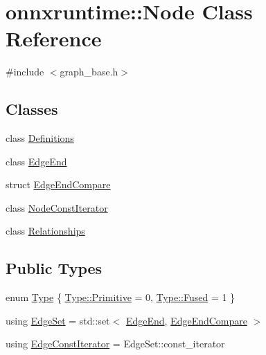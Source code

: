 \hypertarget{classonnxruntime_1_1Node}{}\section{onnxruntime\+:\+:Node Class Reference}
\label{classonnxruntime_1_1Node}


{\ttfamily \#include $<$graph\+\_\+base.\+h$>$}

\subsection*{Classes}
\begin{DoxyCompactItemize}
\item 
class \mbox{\hyperlink{classonnxruntime_1_1Node_1_1Definitions}{Definitions}}
\item 
class \mbox{\hyperlink{classonnxruntime_1_1Node_1_1EdgeEnd}{Edge\+End}}
\item 
struct \mbox{\hyperlink{structonnxruntime_1_1Node_1_1EdgeEndCompare}{Edge\+End\+Compare}}
\item 
class \mbox{\hyperlink{classonnxruntime_1_1Node_1_1NodeConstIterator}{Node\+Const\+Iterator}}
\item 
class \mbox{\hyperlink{classonnxruntime_1_1Node_1_1Relationships}{Relationships}}
\end{DoxyCompactItemize}
\subsection*{Public Types}
\begin{DoxyCompactItemize}
\item 
enum \mbox{\hyperlink{classonnxruntime_1_1Node_a2d9625711aecc66f9b9373d61f794f6a}{Type}} \{ \mbox{\hyperlink{classonnxruntime_1_1Node_a2d9625711aecc66f9b9373d61f794f6aa07ee3427562e4f1a5c9f2bfb17fd9eee}{Type\+::\+Primitive}} = 0, 
\mbox{\hyperlink{classonnxruntime_1_1Node_a2d9625711aecc66f9b9373d61f794f6aaf617f46b788e11a564cb16c9f5d59fea}{Type\+::\+Fused}} = 1
 \}
\item 
using \mbox{\hyperlink{classonnxruntime_1_1Node_a96c203b69f604fcbe80532f9d939dcc6}{Edge\+Set}} = std\+::set$<$ \mbox{\hyperlink{classonnxruntime_1_1Node_1_1EdgeEnd}{Edge\+End}}, \mbox{\hyperlink{structonnxruntime_1_1Node_1_1EdgeEndCompare}{Edge\+End\+Compare}} $>$
\item 
using \mbox{\hyperlink{classonnxruntime_1_1Node_ae0df52e26b0237505b6a0cbc25106d9d}{Edge\+Const\+Iterator}} = Edge\+Set\+::const\+\_\+iterator
\end{DoxyCompactItemize}
